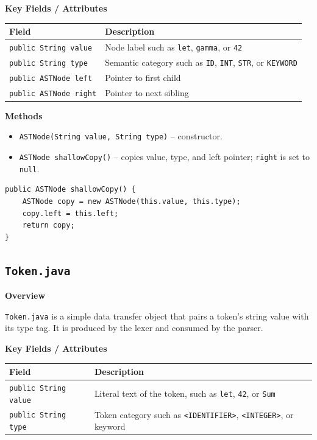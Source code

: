 \documentclass[12pt,a4paper]{article}
\begin{document}
\textbf{Key Fields / Attributes}

\begin{center}
\begin{tabular}{ll}
\toprule
Field & Description \\
\midrule
\texttt{public String value} & Node label such as \texttt{let}, \texttt{gamma}, or \texttt{42} \\
\texttt{public String type} & Semantic category such as \texttt{ID}, \texttt{INT}, \texttt{STR}, or \texttt{KEYWORD} \\
\texttt{public ASTNode left} & Pointer to first child \\
\texttt{public ASTNode right} & Pointer to next sibling \\
\bottomrule
\end{tabular}
\end{center}

\textbf{Methods}

\begin{itemize}
    \item \texttt{ASTNode(String value, String type)} -- constructor.
    \item \texttt{ASTNode shallowCopy()} -- copies value, type, and left pointer; \texttt{right} is set to \texttt{null}.
\end{itemize}

\begin{lstlisting}[style=javacode, caption={ASTNode.shallowCopy()}]
public ASTNode shallowCopy() {
    ASTNode copy = new ASTNode(this.value, this.type);
    copy.left = this.left;
    return copy;
}
\end{lstlisting}

\subsection{\texttt{Token.java}}

\textbf{Overview}

\texttt{Token.java} is a simple data transfer object that pairs a token's string value with its type tag. It is produced by the lexer and consumed by the parser.

\textbf{Key Fields / Attributes}

\begin{center}
\begin{tabular}{ll}
\toprule
Field & Description \\
\midrule
\texttt{public String value} & Literal text of the token, such as \texttt{let}, \texttt{42}, or \texttt{Sum} \\
\texttt{public String type} & Token category such as \texttt{<IDENTIFIER>}, \texttt{<INTEGER>}, or keyword \\
\bottomrule
\end{tabular}
\end{center}
\end{document}
